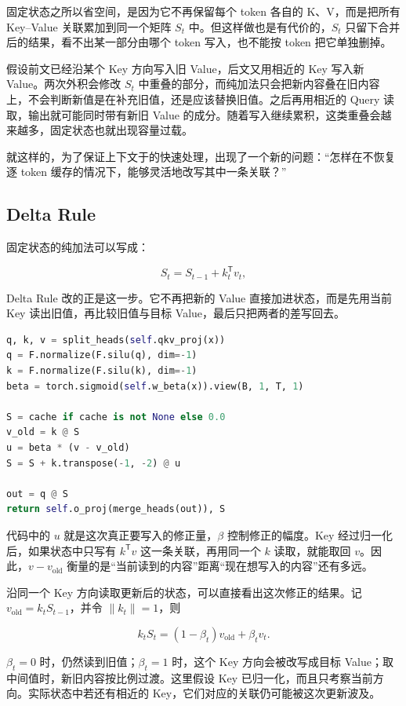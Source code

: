 固定状态之所以省空间，是因为它不再保留每个 token 各自的 K、V，而是把所有 Key--Value 关联累加到同一个矩阵 $S_t$ 中。但这样做也是有代价的，$S_t$ 只留下合并后的结果，看不出某一部分由哪个 token 写入，也不能按 token 把它单独删掉。

假设前文已经沿某个 Key 方向写入旧 Value，后文又用相近的 Key 写入新 Value。两次外积会修改 $S_t$ 中重叠的部分，而纯加法只会把新内容叠在旧内容上，不会判断新值是在补充旧值，还是应该替换旧值。之后再用相近的 Query 读取，输出就可能同时带有新旧 Value 的成分。随着写入继续累积，这类重叠会越来越多，固定状态也就出现容量过载。

就这样的，为了保证上下文于的快速处理，出现了一个新的问题：“怎样在不恢复逐 token 缓存的情况下，能够灵活地改写其中一条关联？”

\subsection{Delta Rule}

固定状态的纯加法可以写成：

\[
S_t=S_{t-1}+k_t^{\mathsf T}v_t,
\]

Delta Rule 改的正是这一步。它不再把新的 Value 直接加进状态，而是先用当前 Key 读出旧值，再比较旧值与目标 Value，最后只把两者的差写回去。\cite{fast-weight}

\begin{lstlisting}[language=Python,caption={带逐 token 写入强度的 Delta 更新}]
q, k, v = split_heads(self.qkv_proj(x))
q = F.normalize(F.silu(q), dim=-1)
k = F.normalize(F.silu(k), dim=-1)
beta = torch.sigmoid(self.w_beta(x)).view(B, 1, T, 1)

S = cache if cache is not None else 0.0
v_old = k @ S
u = beta * (v - v_old)
S = S + k.transpose(-1, -2) @ u

out = q @ S
return self.o_proj(merge_heads(out)), S
\end{lstlisting}

代码中的 $u$ 就是这次真正要写入的修正量，$\beta$ 控制修正的幅度。Key 经过归一化后，如果状态中只写有 $k^{\mathsf T}v$ 这一条关联，再用同一个 $k$ 读取，就能取回 $v$。因此，$v-v_{\mathrm{old}}$ 衡量的是“当前读到的内容”距离“现在想写入的内容”还有多远。

沿同一个 Key 方向读取更新后的状态，可以直接看出这次修正的结果。记 $v_{\mathrm{old}}=k_tS_{t-1}$，并令 $\lVert k_t\rVert=1$，则

\[
k_tS_t=(1-\beta_t)v_{\mathrm{old}}+\beta_t v_t.
\]

$\beta_t=0$ 时，仍然读到旧值；$\beta_t=1$ 时，这个 Key 方向会被改写成目标 Value；取中间值时，新旧内容按比例过渡。这里假设 Key 已归一化，而且只考察当前方向。实际状态中若还有相近的 Key，它们对应的关联仍可能被这次更新波及。

